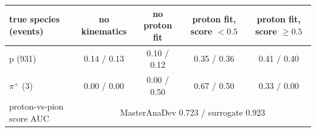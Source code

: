 \begin{tabular}{lcccc}
\toprule
true species (events) & no kinematics & no proton fit & proton fit, score $<0.5$ & proton fit, score $\geq 0.5$ \\
\midrule
p (931) & 0.14 / 0.13 & 0.10 / 0.12 & 0.35 / 0.36 & 0.41 / 0.40 \\
$\pi^+$ (3) & 0.00 / 0.00 & 0.00 / 0.50 & 0.67 / 0.50 & 0.33 / 0.00 \\
\midrule
proton-vs-pion score AUC & \multicolumn{4}{c}{MasterAnaDev 0.723 / surrogate 0.923} \\
\bottomrule
\end{tabular}
